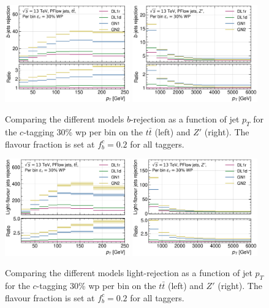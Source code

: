 \begin{figure}[h!]
  \centering
  \includegraphics[width=0.48\textwidth]{Images/FTAG/GN/GN2/pt_plots/pt_ttbar_flat_b_rej_c.png}
  \includegraphics[width=0.48\textwidth]{Images/FTAG/GN/GN2/pt_plots/pt_zp_flat_b_rej_c.png}
  \caption{Comparing the different models $b$-rejection as a function of jet $p_T$ for the $c$-tagging 30\% \gls{wp} per bin on the $t\bar{t}$ (left) and $Z'$ (right). The flavour fraction is set at $f^c_b = 0.2$ for all taggers.}
  \label{fig:GNxptc_brejflat}
\end{figure} 

\begin{figure}[h!]
  \centering
  \includegraphics[width=0.48\textwidth]{Images/FTAG/GN/GN2/pt_plots/pt_ttbar_flat_light_rej_c.png}
  \includegraphics[width=0.48\textwidth]{Images/FTAG/GN/GN2/pt_plots/pt_zp_flat_light_rej_c.png}
  \caption{Comparing the different models light-rejection as a function of jet $p_T$ for the $c$-tagging 30\% \gls{wp} per bin on the $t\bar{t}$ (left) and $Z'$ (right). The flavour fraction is set at $f^c_b = 0.2$ for all taggers.}
  \label{fig:GNxptc_urejflat}
\end{figure} 

